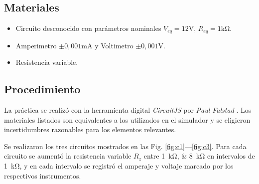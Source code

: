 \subsection*{Materiales}
\begin{itemize}
\item Circuito desconocido con parámetros nominales $V_{eq}=12\unit{\volt}$,
$R_{eq}=1\unit{\kilo\ohm}$.
\item Amperimetro $\pm0,001\unit{\milli\ampere}$ y Voltimetro $\pm0,001\unit{\volt}$.
\item Resistencia variable.
\end{itemize}

\subsection*{Procedimiento}
La práctica se realizó con la herramienta digital {\it CircuitJS} por {\it Paul Falstad}
\cite{falstad}. Los materiales listados son equivalentes a los utilizados en el simulador y
se eligieron incertidumbres razonables para los elementos relevantes.

Se realizaron los tres circuitos mostrados en las Fig. \ref{fig:c1}---\ref{fig:c3}.
Para cada circuito se aumentó la resistencia variable $R_z$ entre \qtylist{1;8}{\kilo\ohm}
en intervalos de \qty{1}{\kilo\ohm}, y en cada intervalo se registró el amperaje y
voltaje marcado por los respectivos instrumentos.